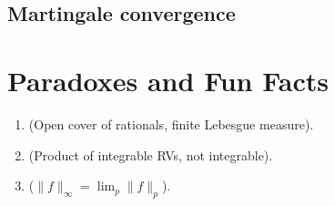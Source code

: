 \documentclass[a4paper,10pt]{article}
\begin{document}
\subsection{Martingale convergence}
\section{Paradoxes and Fun Facts}
\begin{enumerate}
 \item (Open cover of rationals, finite Lebesgue measure).
 \item (Product of integrable RVs, not integrable).
 \item ($\|f\|_\infty = \lim_p \|f\|_p$).
\end{enumerate}
\end{document}
